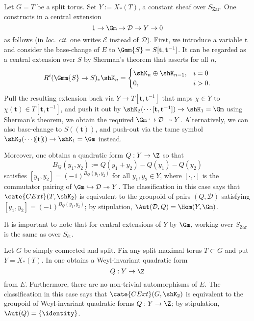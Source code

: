 \documentclass[a4paper,10pt]{article}
\begin{document}
\begin{asparaenum}[\bfseries (A)]
	\item Let $G=T$ be a split torus. Set $Y := X_*(T)$, a constant sheaf over $S_\text{Zar}$. One constructs in \cite[\S 3]{BD01} a central extension
		\begin{equation}\label{eqn:D-extension}
			1 \to \Gm \to \mathcal{D} \to Y \to 0
		\end{equation} 
		as follows (in \textit{loc. cit.} one writes $\mathcal{E}$ instead of $\mathcal{D}$). First, we introduce a variable $\mathbf{t}$ and consider the base-change of $E$ to $\Gmm{S} = S[\mathbf{t}, \mathbf{t}^{-1}]$. It can be regarded as a central extension over $S$ by Sherman's theorem \cite[(3.1.2)]{BD01} that asserts for all $n$,
			\[ R^i(\Gmm{S} \to S)_* \shK_n = \begin{cases}
					\shK_n \oplus \shK_{n-1}, & i=0 \\
					0, & i > 0.
			\end{cases}	\]
			Pull the resulting extension back via $Y \to T[\mathbf{t}, \mathbf{t}^{-1}]$ that maps $\chi \in Y$ to $\chi(\mathbf{t}) \in T[\mathbf{t}, \mathbf{t}^{-1}]$, and push it out by $\shK_2(\cdots [\mathbf{t}, \mathbf{t}^{-1}]) \to \shK_1 = \Gm$ using Sherman's theorem, we obtain the required $\Gm \hookrightarrow \mathcal{D} \twoheadrightarrow Y$. Alternatively, we can also base-change to $S(\!(\mathbf{t})\!)$, and push-out via the tame symbol \cite[III. Lemma 6.3]{Wei13} $\shK_2(\cdots (\!(\mathbf{t})\!)) \to \shK_1 = \Gm$ instead.
			
			Moreover, one obtains a quadratic form $Q: Y \to \Z$ so that
			\[ B_Q(y_1, y_2) := Q(y_1 + y_2) - Q(y_1) - Q(y_2) \]
			satisfies $[y_1, y_2] = (-1)^{B_Q(y_1, y_2)}$ for all $y_1, y_2 \in Y$, where $[\cdot, \cdot]$ is the commutator pairing of $\Gm \hookrightarrow \mathcal{D} \twoheadrightarrow Y$. The classification in this case \cite[Proposition 3.11]{BD01} says that $\cate{CExt}(T,\shK_2)$ is equivalent to the groupoid of pairs $(Q, \mathcal{D})$ satisfying $[y_1, y_2] = (-1)^{B_Q(y_1, y_2)}$; by stipulation, $\Aut(\mathcal{D}, Q) = \Hom(Y, \Gm)$.
			
			It is important to note that for central extensions of $Y$ by $\Gm$, working over $S_\text{Zar}$ is the same as over $S_\text{ét}$.
	\item Let $G$ be simply connected and split. Fix any split maximal torus $T \subset G$ and put $Y = X_*(T)$. In \cite[\S 4]{BD01} one obtains a Weyl-invariant quadratic form
		\[Q: Y \to \Z \]
		from $E$. Furthermore, there are no non-trivial automorphisms of $E$. The classification in this case \cite[Theorem 4.7]{BD01} says that $\cate{CExt}(G, \shK_2)$ is equivalent to the groupoid of Weyl-invariant quadratic forms $Q: Y \to \Z$; by stipulation, $\Aut(Q) = \{\identity\}$.
		

\end{asparaenum}
\end{document}
